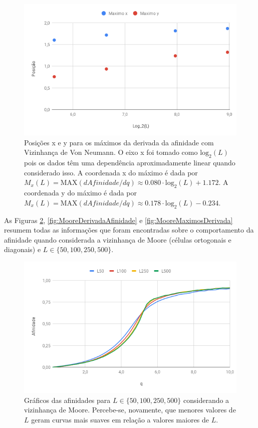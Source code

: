 \documentclass[12pt,a4paper,final]{article}
\begin{document}
  \begin{figure}[h]
    \centering
    \includegraphics[width=.7\linewidth]{VonNeumannMaximosDerivada.png}
    \caption{Posições x e y para os máximos da derivada da afinidade com Vizinhança de Von Neumann. O eixo x foi tomado como $\mathrm{log_2}(L)$ pois os dados têm uma dependência aproximadamente linear quando considerado isso. A coordenada x do máximo é dada por $M_{x}(L) = \mathrm{MAX}(d Afinidade / dq) \approx 0.080\cdot\mathrm{log_2}(L)+1.172$. A coordenada y do máximo é dada por $M_{x}(L) = \mathrm{MAX}(d Afinidade / dq) \approx 0.178\cdot\mathrm{log_2}(L)-0.234$.}
    \label{fig:VonNeumannMaximosDerivada}
  \end{figure}

  As Figuras \ref{fig:MooreAfinidades}, \ref{fig:MooreDerivadaAfinidade} e \ref{fig:MooreMaximosDerivada} resumem todas as informações que foram encontradas sobre o comportamento da afinidade quando considerada a vizinhança de Moore (células ortogonais e diagonais) e $L\in\{50, 100, 250, 500\}$.

  \begin{figure}[h]
    \centering
    \includegraphics[width=.7\linewidth]{MooreAfinidades.png}
    \caption{Gráficos das afinidades para $L\in\{50, 100, 250, 500\}$ considerando a vizinhança de Moore. Percebe-se, novamente, que menores valores de $L$ geram curvas mais suaves em relação a valores maiores de $L$.}
    \label{fig:MooreAfinidades}
  \end{figure}
\end{document}
